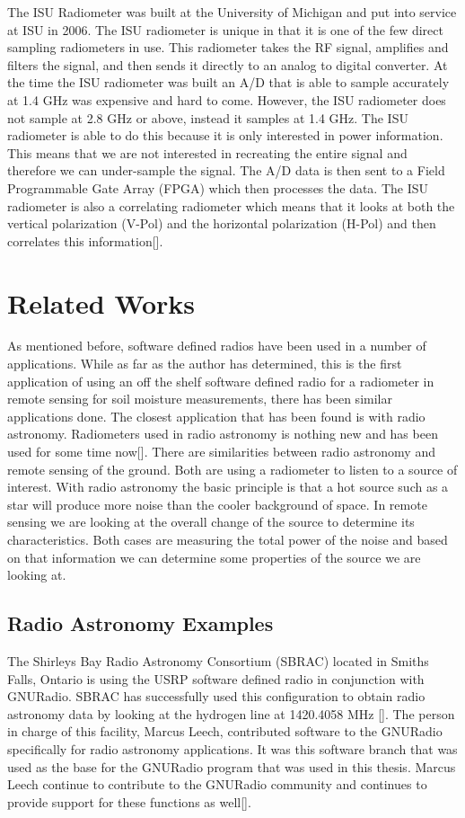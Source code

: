 The ISU Radiometer was built at the University of Michigan and put into service at ISU in 2006.  The ISU radiometer is unique in that it is one of the few direct sampling radiometers in use\cite{Erbas}.  This radiometer takes the RF signal, amplifies and filters the signal, and then sends it directly to an analog to digital converter.  At the time the ISU radiometer was built an A/D that is able to sample accurately at 1.4 GHz was expensive and hard to come.  However, the ISU radiometer does not sample at 2.8 GHz or above, instead it samples at 1.4 GHz.  The ISU radiometer is able to do this because it is only interested in power information.  This means that we are not interested in recreating the entire signal and therefore we can under-sample the signal.  The A/D data is then sent to a Field Programmable Gate Array (FPGA) which then processes the data.  The ISU radiometer is also a correlating radiometer which means that it looks at both the vertical polarization (V-Pol) and the horizontal polarization (H-Pol) and then correlates this information[\cite{Fischman2001}].  

\section{Related Works}
As mentioned before, software defined radios have been used in a number of applications.  While as far as the author has determined, this is the first application of using an off the shelf software defined radio for a radiometer in remote sensing for soil moisture measurements, there has been similar applications done.  The closest application that has been found is with radio astronomy.  Radiometers used in radio astronomy is nothing new and has been used for some time now[\cite{Ohm}]. There are similarities between radio astronomy and remote sensing of the ground.  Both are using a radiometer to listen to a source of interest.  With radio astronomy the basic principle is that a hot source such as a star will produce more noise than the cooler background of space.  In remote sensing we are looking at the overall change of the source to determine its characteristics.  Both cases are measuring the total power of the noise and based on that information we can determine some properties of the source we are looking at.

\subsection{Radio Astronomy Examples}
The Shirleys Bay Radio Astronomy Consortium (SBRAC) located in Smiths Falls, Ontario is using the USRP software defined radio in conjunction with GNURadio.  SBRAC has successfully used this configuration to obtain radio astronomy data by looking at the hydrogen line at 1420.4058 MHz [\cite{Leech2007}].  The person in charge of this facility, Marcus Leech, contributed software to the GNURadio specifically for radio astronomy applications.  It was this software branch that was used as the base for the GNURadio program that was used in this thesis.  Marcus Leech continue to contribute to the GNURadio community and continues to provide support for these functions as well[\cite{Leech}].


